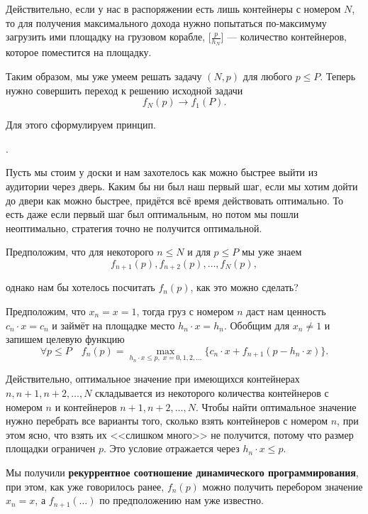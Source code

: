 Действительно, если у нас в распоряжении есть лишь контейнеры с номером $N$, то для получения максимального дохода нужно попытаться по-максимуму загрузить ими площадку на грузовом корабле, $\big[\frac{p}{h_N}\big]$ --- количество контейнеров, которое поместится на площадку.

Таким образом, мы уже умеем решать задачу $(N, p)$ для любого $p \le P$. Теперь нужно совершить переход к решению исходной задачи
\[
f_N(p) \longrightarrow f_1(P).
\]

Для этого сформулируем принцип.


.

\example

Пусть мы стоим у доски и нам захотелось как можно быстрее выйти из аудитории через дверь. Каким бы ни был наш первый шаг, если мы хотим дойти до двери как можно быстрее, придётся всё время действовать оптимально. То есть даже если первый шаг был оптимальным, но потом мы пошли неоптимально, стратегия точно не получится оптимальной.

\returntoproblem

Предположим, что для некоторого $n \le N$ и для $p \le P$ мы уже знаем
\[
f_{n+1}(p), f_{n+2}(p), \dots, f_{N}(p),
\]

однако нам бы хотелось посчитать $f_n(p)$, как это можно сделать?

Предположим, что $x_n = x = 1$, тогда груз с номером $n$ даст нам ценность $c_n \cdot x = c_n$ и займёт на площадке место $h_n \cdot x = h_n$. Обобщим для $x_n \neq 1$ и запишем целевую функцию
\[
\boxed{\forall p \le P \quad f_n(p) = \max_{h_n \cdot x \le p, \; x = 0, 1, 2, \dots} \big\{c_n \cdot x + f_{n+1}(p - h_n \cdot x)\big\}}.
\]

Действительно, оптимальное значение при имеющихся контейнерах $n, n+1, n+2, \dots, N$ складывается из некоторого количества контейнеров с номером $n$ и контейнеров $n+1, n+2, \dots, N$. Чтобы найти оптимальное значение нужно перебрать все варианты того, сколько взять контейнеров с номером $n$, при этом ясно, что взять их <<слишком много>> не получится, потому что размер площадки ограничен $p$. Это условие отражается через $h_n \cdot x \le p$.

Мы получили \textbf{рекуррентное соотношение динамического программирования}, при этом, как уже говорилось ранее, $f_n(p)$ можно получить перебором значение $x_n = x$, а $f_{n+1}(\dots)$ по предположению нам уже известно.

